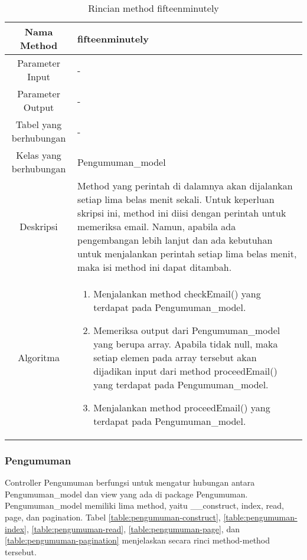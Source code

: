 \begin{center}
	\begin{table}[H]
	\caption{Rincian method fifteenminutely}
	\label{table:cron-daily}
\begin{tabular}{|c|p{11cm}|}
\hline
Nama Method 	& 	fifteenminutely 	\\
\hline
Parameter Input & - \\
\hline
Parameter Output & - \\
\hline
Tabel yang berhubungan & - \\
\hline
Kelas yang berhubungan & Pengumuman\_model \\
\hline
Deskripsi	& Method yang perintah di dalamnya akan dijalankan setiap lima belas menit sekali. Untuk keperluan skripsi ini, method ini diisi dengan perintah untuk memeriksa email. Namun, apabila ada pengembangan lebih lanjut dan ada kebutuhan untuk menjalankan perintah setiap lima belas menit, maka isi method ini dapat ditambah.\\
\hline
Algoritma	& \begin{enumerate}
				\item Menjalankan method checkEmail() yang terdapat pada Pengumuman\_model.
				\item Memeriksa output dari Pengumuman\_model yang berupa array. Apabila tidak null, maka setiap elemen pada array tersebut akan dijadikan input dari method proceedEmail() yang terdapat pada Pengumuman\_model.
				\item Menjalankan method proceedEmail() yang terdapat pada Pengumuman\_model.
				\end{enumerate} \\
\hline
\end{tabular}
\end{table}
\end{center}

\subsubsection{Pengumuman}
Controller Pengumuman berfungsi untuk mengatur hubungan antara Pengumuman\_model dan view yang ada di package Pengumuman. Pengumuman\_model memiliki lima method, yaitu \_\_construct, index, read, page, dan pagination. Tabel \ref{table:pengumuman-construct}, \ref{table:pengumuman-index}, \ref{table:pengumuman-read}, \ref{table:pengumuman-page}, dan \ref{table:pengumuman-pagination} menjelaskan secara rinci method-method tersebut.

